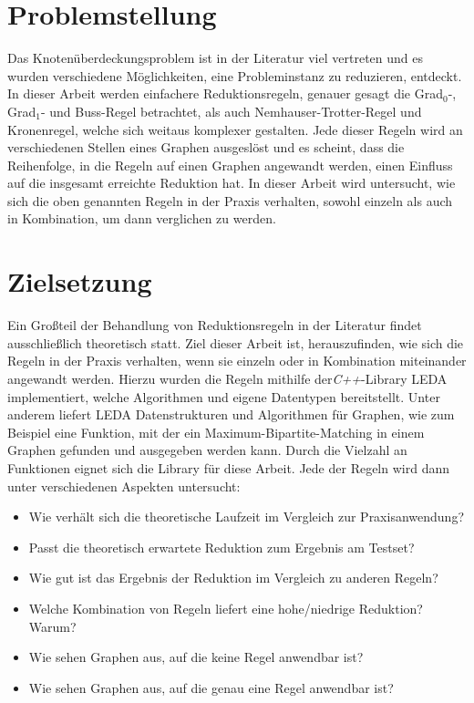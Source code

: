 \section{Problemstellung}
\label{ch:Einleitung:sec:Problemstellung}

Das Knotenüberdeckungsproblem ist in der Literatur viel vertreten und es wurden verschiedene Möglichkeiten, eine Probleminstanz zu reduzieren, entdeckt. In dieser Arbeit werden einfachere Reduktionsregeln, genauer gesagt die Grad$_{0}$-, Grad$_{1}$- und Buss-Regel betrachtet, als auch Nemhauser-Trotter-Regel und Kronenregel, welche sich weitaus komplexer gestalten. Jede dieser Regeln wird an verschiedenen Stellen eines Graphen ausgeslöst und es scheint, dass die Reihenfolge, in die Regeln auf einen Graphen angewandt werden, einen Einfluss auf die insgesamt erreichte Reduktion hat. In dieser Arbeit wird untersucht, wie sich die oben genannten Regeln in der Praxis verhalten, sowohl einzeln als auch in Kombination, um dann verglichen zu werden. 

\section{Zielsetzung}
\label{ch:Einleitung:sec:Zielsetzung}

Ein Großteil der Behandlung von Reduktionsregeln in der Literatur findet ausschließlich theoretisch statt.
Ziel dieser Arbeit ist, herauszufinden, wie sich die Regeln in der Praxis verhalten, wenn sie einzeln oder in Kombination miteinander angewandt werden. Hierzu wurden die Regeln mithilfe der\emph{C++}-Library LEDA \cite{manual} implementiert, welche Algorithmen und eigene Datentypen bereitstellt. Unter anderem liefert LEDA Datenstrukturen und Algorithmen für Graphen, wie zum Beispiel eine Funktion, mit der ein Maximum-Bipartite-Matching in einem Graphen gefunden und ausgegeben werden kann. Durch die Vielzahl an Funktionen eignet sich die Library für diese Arbeit. Jede der  Regeln wird dann unter verschiedenen Aspekten untersucht:
\begin{itemize}
\item Wie verhält sich die theoretische Laufzeit im Vergleich zur Praxisanwendung?
\item Passt die theoretisch erwartete Reduktion zum Ergebnis am Testset?
\item Wie gut ist das Ergebnis der Reduktion im Vergleich zu anderen Regeln?
\item Welche Kombination von Regeln liefert eine hohe/niedrige Reduktion? Warum?
\item Wie sehen Graphen aus, auf die keine Regel anwendbar ist?
\item Wie sehen Graphen aus, auf die genau eine Regel anwendbar ist?
\end{itemize}

